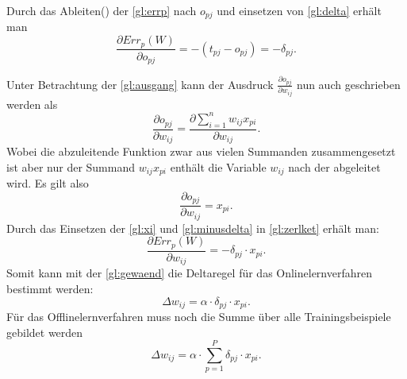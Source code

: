 Durch das Ableiten() der \autoref{gl:errp} nach $o_{pj}$ und einsetzen von \autoref{gl:delta} erhält man
\begin{equation}
\frac{\partial Err_p(W)}{\partial o_{pj}} = -(t_{pj}-o_{pj}) = - \delta_{pj} .
\label{gl:minusdelta}
\end{equation}

Unter Betrachtung der \autoref{gl:ausgang} kann der Ausdruck $ \frac{\partial o_{pj}}{\partial w_{ij}}$ nun auch geschrieben werden als 
\begin{equation}
\frac{\partial o_{pj}}{\partial w_{ij}} = \frac{\partial \sum\limits_{i=1}^n w_{ij} x_{pi}}{\partial w_{ij}} .
\label{gl:vor_xi}
\end{equation}
Wobei die abzuleitende Funktion zwar aus vielen Summanden zusammengesetzt ist aber nur der Summand $w_{ij} x_{pi}$ enthält die Variable $w_{ij}$ nach der abgeleitet wird. Es gilt also
\begin{equation}
\frac{\partial o_{pj}}{\partial w_{ij}} = x_{pi}.
\label{gl:xi}
\end{equation}
Durch das Einsetzen der \autoref{gl:xi} und \autoref{gl:minusdelta} in \autoref{gl:zerlket} erhält man:
\begin{equation}
\frac{\partial Err_p(W)}{\partial w_{ij}}= - \delta_{pj} \cdot x_{pi}.
\label{gl:ze}
\end{equation}
Somit kann mit der \autoref{gl:gewaend} die Deltaregel für das Onlinelernverfahren bestimmt werden:
\begin{equation}
\Delta w_{ij} = \alpha \cdot \delta_{pj} \cdot x_{pi} .
\label{gl:fertig_delta}
\end{equation}
Für das Offlinelernverfahren muss noch die Summe über alle Trainingsbeispiele gebildet werden
\begin{equation}
\Delta w_{ij} = \alpha \cdot \sum^P_{p=1} \delta_{pj} \cdot x_{pi} .
\end{equation}



